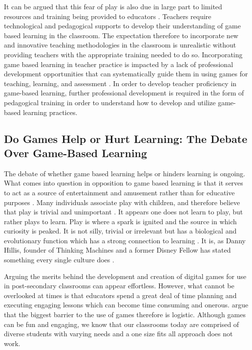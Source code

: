 \documentclass{article}
\begin{document}
It can be argued that this fear of play is also due in large part to limited resources and training being provided to educators \citep{fishman2014empowering}. Teachers require technological and pedagogical supports to develop their understanding of game based learning in the classroom. The expectation therefore to incorporate new and innovative teaching methodologies in the classroom is unrealistic without providing teachers with the appropriate training needed to do so. Incorporating game based learning in teacher practice is impacted by a lack of professional development opportunities that can systematically guide them in using games for teaching, learning, and assessment \citep{fishman2014empowering,ruggiero2013video,foster2020principles}. In order to develop teacher proficiency in game-based learning, further professional development is required in the form of pedagogical training in order to understand how to develop and utilize game-based learning practices.


\subsection{Do Games Help or Hurt Learning: The Debate Over Game-Based Learning}

The debate of whether game based learning helps or hinders learning is ongoing. What comes into question in opposition to game based learning is that it serves to act as a source of entertainment and amusement rather than for educative purposes \citep{lister2015gamification, mayer2010adding}. Many individuals associate play with children, and therefore believe that play is trivial and unimportant \citep{prensky2001fun}. It appears one does not learn to play, but rather plays to learn. Play is where a spark is ignited and the source in which curiosity is peaked. It is not silly, trivial or irrelevant but has a biological and evolutionary function which has a strong connection to learning \citep{prensky2001fun}. It is, as Danny Hillis, founder of Thinking Machines and a former Disney Fellow has stated something every single culture does \citep{prensky2001fun}.

Arguing the merits behind the development and creation of digital games for use in post-secondary classrooms can appear effortless. However, what cannot be overlooked at times is that educators spend a great deal of time planning and executing engaging lessons which can become time consuming and onerous. \citet{mckeachie2013mckeachie} argue that the biggest barrier to the use of games therefore is logistic. Although games can be fun and engaging, we know that our classrooms today are comprised of diverse students with varying needs and a one size fits all approach does not work.
\end{document}
